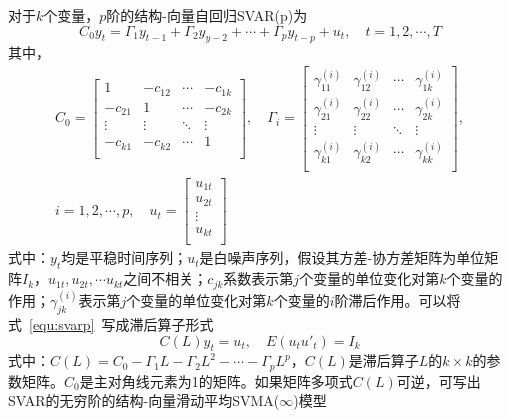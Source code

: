 对于$k$个变量，$p$阶的结构-向量自回归SVAR(p)为
\begin{equation}
	\label{equ:svarp}
	{{C}_{0}}{{y}_{t}}={{\Gamma }_{1}}{{y}_{t-1}}+{{\Gamma }_{2}}{{y}_{y-2}}+\cdots +{{\Gamma }_{p}}{{y}_{t-p}}+{{u}_{t}},\quad t=1,2,\cdots ,T
\end{equation}
其中，
\begin{gather}
  {{C}_{0}}=\left[ \begin{matrix}
   1 & -{{c}_{12}} & \cdots  & -{{c}_{1k}}  \\
   -{{c}_{21}} & 1 & \cdots  & -{{c}_{2k}}  \\
   \vdots  & \vdots  & \ddots  & \vdots   \\
   -{{c}_{k1}} & -{{c}_{k2}} & \cdots  & 1  \\
\end{matrix} \right],\quad {{\Gamma }_{i}}=\left[ \begin{matrix}
   \gamma _{11}^{(i)} & \gamma _{12}^{(i)} & \cdots  & \gamma _{1k}^{(i)}  \\
   \gamma _{21}^{(i)} & \gamma _{22}^{(i)} & \cdots  & \gamma _{2k}^{(i)}  \\
   \vdots  & \vdots  & \ddots  & \vdots   \\
   \gamma _{k1}^{(i)} & \gamma _{k2}^{(i)} & \cdots  & \gamma _{kk}^{(i)}  \\
\end{matrix} \right], \nonumber \\ 
 i=1,2,\cdots ,p,\quad {{u}_{t}}=\left[ \begin{matrix}
   {{u}_{1t}}  \\
   {{u}_{2t}}  \\
   \vdots   \\
   {{u}_{kt}}  \\
\end{matrix} \right] \nonumber
\end{gather}
式中：$y_t$均是平稳时间序列；$u_t$是白噪声序列，假设其方差-协方差矩阵为单位矩阵$I_k$，${u}_{1t},{u}_{2t},\cdots {u}_{kt}$之间不相关；$c_{jk}$系数表示第$j$个变量的单位变化对第$k$个变量的作用；$\gamma _{jk}^{(i)}$表示第$j$个变量的单位变化对第$k$个变量的$i$阶滞后作用。可以将式~\ref{equ:svarp}~写成滞后算子形式
\begin{equation}
	C(L){{y}_{t}}={{u}_{t}},\quad E({{u}_{t}}{{{u}'}_{t}})={{I}_{k}}
\end{equation}
式中：$C(L)={{C}_{0}}-{{\Gamma }_{1}}L-{{\Gamma }_{2}}{{L}^{2}}-\cdots -{{\Gamma }_{p}}{{L}^{p}}$，$C(L)$是滞后算子$L$的$k\times k$的参数矩阵。$C_0$是主对角线元素为1的矩阵。如果矩阵多项式$C(L)$可逆，可写出SVAR的无穷阶的结构-向量滑动平均SVMA($\infty $)模型
